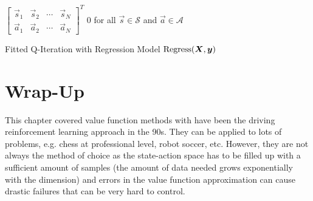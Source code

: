 			\begin{algorithm}  \DontPrintSemicolon
				 \(
				\begin{bmatrix}
					\vec{s}_1 & \vec{s}_2 & \cdots & \vec{s}_N \\
					\vec{a}_1 & \vec{a}_2 & \cdots & \vec{a}_N
				\end{bmatrix}^T
				\) \;
				 \( 0 \) for all \( \vec{s} \in \mathcal{S} \) and \( \vec{a} \in \mathcal{A} \) \;

				\caption{Fitted Q-Iteration with Regression Model \texorpdfstring{\( \mathrm{Regress}(\bm{X}, \bm{y}) \)}{Regress(X, y)}}
				\label{alg:fittedQIteration}
			\end{algorithm}

	\section{Wrap-Up}
		This chapter covered value function methods with have been the driving reinforcement learning approach in the 90s. They can be applied to lots of problems, e.g. chess at professional level, robot soccer, etc. However, they are not always the method of choice as the state-action space has to be filled up with a sufficient amount of samples (the amount of data needed grows exponentially with the dimension) and errors in the value function approximation can cause drastic failures that can be very hard to control.


